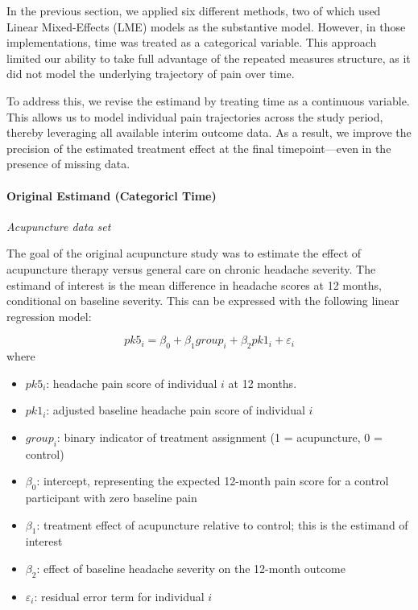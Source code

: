 \documentclass{article}
\providecommand{\tightlist}{%
  \setlength{\itemsep}{0pt}\setlength{\parskip}{0pt}}
\begin{document}
In the previous section, we applied six different methods, two of which
used Linear Mixed-Effects (LME) models as the substantive model.
However, in those implementations, time was treated as a categorical
variable. This approach limited our ability to take full advantage of
the repeated measures structure, as it did not model the underlying
trajectory of pain over time.

To address this, we revise the estimand by treating time as a continuous
variable. This allows us to model individual pain trajectories across
the study period, thereby leveraging all available interim outcome data.
As a result, we improve the precision of the estimated treatment effect
at the final timepoint---even in the presence of missing data.

\paragraph{Original Estimand (Categoricl
Time)}\label{original-estimand-categoricl-time}

\emph{Acupuncture data set}

The goal of the original acupuncture study was to estimate the effect of
acupuncture therapy versus general care on chronic headache severity.
The estimand of interest is the mean difference in headache scores at 12
months, conditional on baseline severity. This can be expressed with the
following linear regression model:

\[pk5_i = \beta_0 + \beta_1 group_i + \beta_2 pk1_i + \varepsilon_i\]
where

\begin{itemize}
\tightlist
\item
  \(pk5_i\): headache pain score of individual \(i\) at 12 months.
\item
  \(pk1_i\): adjusted baseline headache pain score of individual \(i\)
\item
  \(group_i\): binary indicator of treatment assignment (1 =
  acupuncture, 0 = control)
\item
  \(\beta_0\): intercept, representing the expected 12-month pain score
  for a control participant with zero baseline pain
\item
  \(\beta_1\): treatment effect of acupuncture relative to control; this
  is the estimand of interest
\item
  \(\beta_2\): effect of baseline headache severity on the 12-month
  outcome
\item
  \(\varepsilon_i\): residual error term for individual \(i\)
\end{itemize}
\end{document}
